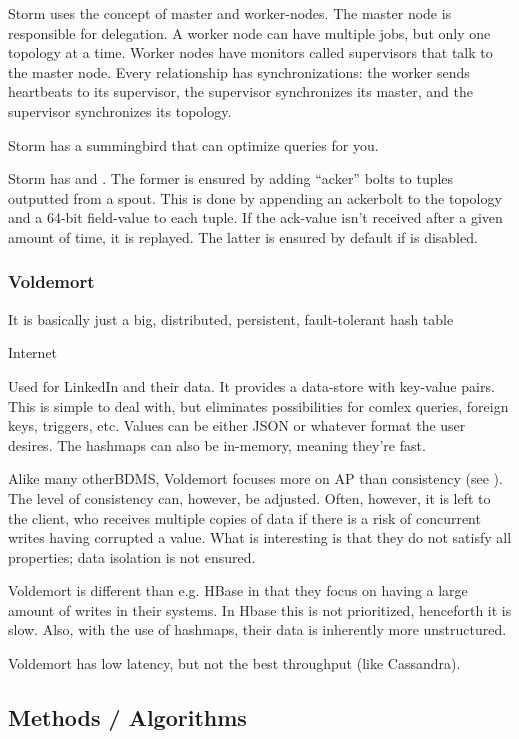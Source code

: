 Storm uses the concept of master and worker-nodes. The master node is responsible for delegation.
A worker node can have multiple jobs, but only one topology at a time. Worker nodes have 
monitors called supervisors that talk to the master node.
Every relationship has synchronizations: the worker sends heartbeats to its supervisor, the supervisor
synchronizes its master,  and the supervisor synchronizes its topology.

Storm has a summingbird that can optimize queries for you.

Storm has  and . The former is ensured
by adding ``acker'' bolts to tuples outputted from a spout. This is done by appending
an ackerbolt to the topology and a 64-bit field-value to each tuple. If the ack-value
isn't received after a given amount of time, it is replayed. The latter is
ensured by default if  is disabled.




\subsubsection{Voldemort}\label{sec:voldemort}
\epigraph{It is basically just a big, distributed, persistent, fault-tolerant hash table}{Internet}

Used for LinkedIn and their data. It provides a data-store with key-value
pairs. This is simple to deal with, but eliminates possibilities for comlex
queries, foreign keys, triggers, etc.  Values can be either JSON or whatever format the user desires.
The hashmaps can also be in-memory, meaning they're fast.

Alike many otherBDMS, Voldemort focuses more on AP than
consistency (see ). The level of consistency can,
however, be adjusted. Often, however, it is left to the client, who receives multiple
copies of data if there is a risk of concurrent writes having corrupted a value.
What is interesting is that they do not satisfy all
 properties; data isolation is not ensured. 

Voldemort is different than e.g. HBase in that they focus on having a large
amount of writes in their systems.  In Hbase this is not prioritized,
henceforth it is slow. Also, with the use of hashmaps, their data is inherently
more unstructured.

Voldemort has low latency, but not the best throughput (like Cassandra).

\subsection{Methods / Algorithms}
